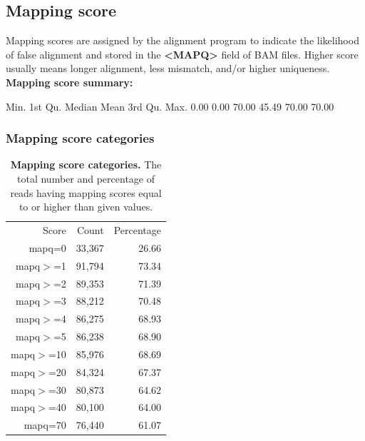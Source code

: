\documentclass{article}
\begin{document}
\subsection{Mapping score}
Mapping scores are assigned by the alignment program to indicate the likelihood of false alignment and stored in the \textbf{<MAPQ>} field of BAM files. Higher score usually means longer alignment, less mismatch, and/or higher uniqueness. 
\vspace*{1\baselineskip}
\\{\textbf{Mapping score summary:}}
\begin{Schunk}
\begin{Soutput}
   Min. 1st Qu.  Median    Mean 3rd Qu.    Max. 
   0.00    0.00   70.00   45.49   70.00   70.00 
\end{Soutput}
\end{Schunk}

\subsubsection{Mapping score categories}
\vspace*{1\baselineskip}
\begin{table}
\begin{tabular}{|r|r|r|}
  \hline
Score & Count & Percentage \\ 
  \rowcolor[gray]{0.9} \hline
mapq=0 & 33,367 & 26.66 \\ 
  mapq$>$=1 & 91,794 & 73.34 \\ 
   \rowcolor[gray]{0.9}mapq$>$=2 & 89,353 & 71.39 \\ 
  mapq$>$=3 & 88,212 & 70.48 \\ 
   \rowcolor[gray]{0.9}mapq$>$=4 & 86,275 & 68.93 \\ 
  mapq$>$=5 & 86,238 & 68.90 \\ 
   \rowcolor[gray]{0.9}mapq$>$=10 & 85,976 & 68.69 \\ 
  mapq$>$=20 & 84,324 & 67.37 \\ 
   \rowcolor[gray]{0.9}mapq$>$=30 & 80,873 & 64.62 \\ 
  mapq$>$=40 & 80,100 & 64.00 \\ 
   \rowcolor[gray]{0.9}mapq=70 & 76,440 & 61.07 \\ 
   \hline
\end{tabular}\caption{\textbf{Mapping score categories.} The total number and percentage of reads having mapping scores equal to or higher than given values.}
\end{table}
\end{document}
